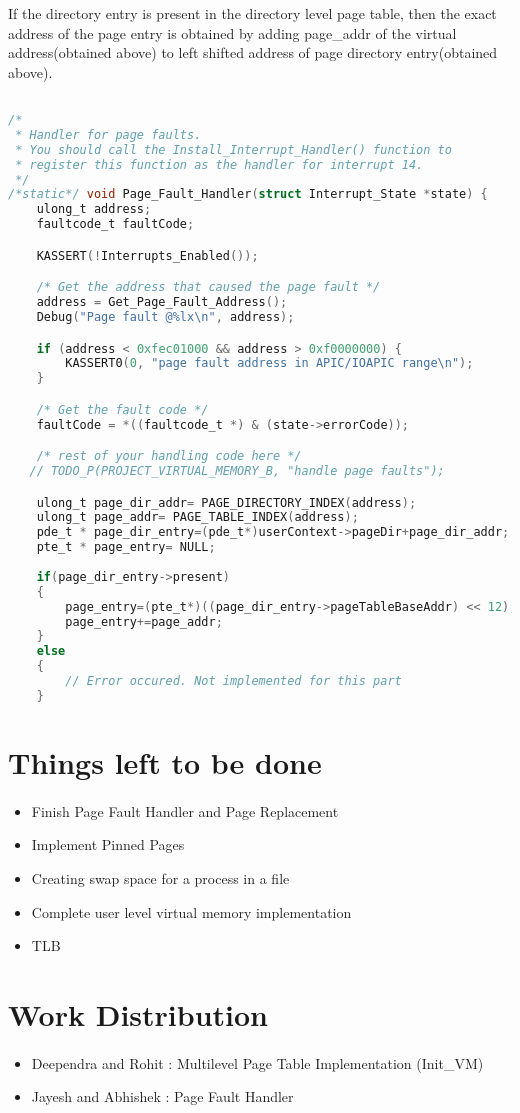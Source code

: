\documentclass[11pt]{article}
\begin{document}
If the directory entry is present in the directory level page table, then the exact address of the page entry is obtained by adding page\_addr of the virtual address(obtained above) to left shifted address of page directory entry(obtained above).

\pagebreak

\begin{lstlisting}[language=c]

/*
 * Handler for page faults.
 * You should call the Install_Interrupt_Handler() function to
 * register this function as the handler for interrupt 14.
 */
/*static*/ void Page_Fault_Handler(struct Interrupt_State *state) {
    ulong_t address;
    faultcode_t faultCode;

    KASSERT(!Interrupts_Enabled());

    /* Get the address that caused the page fault */
    address = Get_Page_Fault_Address();
    Debug("Page fault @%lx\n", address);

    if (address < 0xfec01000 && address > 0xf0000000) {
        KASSERT0(0, "page fault address in APIC/IOAPIC range\n");
    }

    /* Get the fault code */
    faultCode = *((faultcode_t *) & (state->errorCode));

    /* rest of your handling code here */
   // TODO_P(PROJECT_VIRTUAL_MEMORY_B, "handle page faults");

    ulong_t page_dir_addr= PAGE_DIRECTORY_INDEX(address);
    ulong_t page_addr= PAGE_TABLE_INDEX(address);
    pde_t * page_dir_entry=(pde_t*)userContext->pageDir+page_dir_addr;
    pte_t * page_entry= NULL;
    
    if(page_dir_entry->present)
    {
        page_entry=(pte_t*)((page_dir_entry->pageTableBaseAddr) << 12);
        page_entry+=page_addr;
    }
    else
    {
		// Error occured. Not implemented for this part
    }
\end{lstlisting}


\section{Things left to be done}
\paragraph{}

\begin{itemize}
\item Finish Page Fault Handler and Page Replacement
\item Implement Pinned Pages
\item Creating swap space for a process in a file
\item Complete user level virtual memory implementation
\item TLB
\end{itemize}

\section{Work Distribution}
\paragraph{}
\begin{itemize}
\item Deependra and Rohit : Multilevel Page Table Implementation (Init\_VM)
\item Jayesh and Abhishek : Page Fault Handler
\end{itemize}
\end{document}
